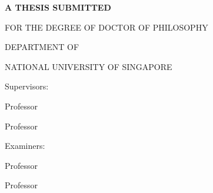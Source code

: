\thispagestyle{empty}

\noindent\begin{minipage}[c][\textheight]{\textwidth}
\centering
\singlespace

\large
\bfseries
\bigskip
\bigskip
\bigskip
\bigskip


\vspace*{\fill}

\mdseries


\vspace*{\fill}
\bfseries
A THESIS SUBMITTED

FOR THE DEGREE OF DOCTOR OF PHILOSOPHY

DEPARTMENT OF %

NATIONAL UNIVERSITY OF SINGAPORE
\bigskip
\bigskip

\vspace*{\fill}

\normalsize
\mdseries
Supervisors:

Professor %

Professor %
\bigskip

Examiners:

Professor %

Professor %

\end{minipage}
\newpage
